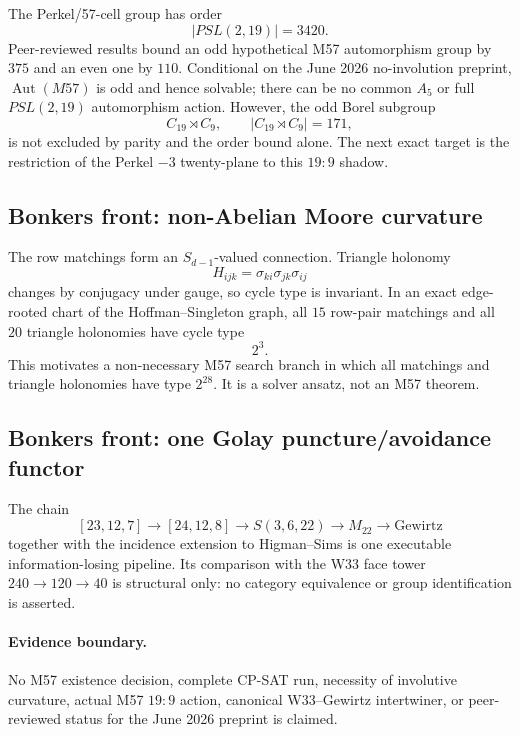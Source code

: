 The Perkel/57-cell group has order
\[
|PSL(2,19)|=3420.
\]
Peer-reviewed results bound an odd hypothetical M57 automorphism group by
\(375\) and an even one by \(110\).  Conditional on the June 2026
no-involution preprint, \(\operatorname{Aut}(M57)\) is odd and hence solvable;
there can be no common \(A_5\) or full \(PSL(2,19)\) automorphism action.
However, the odd Borel subgroup
\[
C_{19}\rtimes C_9,\qquad |C_{19}\rtimes C_9|=171,
\]
is not excluded by parity and the order bound alone.  The next exact target is
the restriction of the Perkel \(-3\) twenty-plane to this \(19{:}9\) shadow.

\subsection{Bonkers front: non-Abelian Moore curvature}

The row matchings form an \(S_{d-1}\)-valued connection.  Triangle holonomy
\[
H_{ijk}=\sigma_{ki}\sigma_{jk}\sigma_{ij}
\]
changes by conjugacy under gauge, so cycle type is invariant.  In an exact
edge-rooted chart of the Hoffman--Singleton graph, all \(15\) row-pair
matchings and all \(20\) triangle holonomies have cycle type
\[
2^3.
\]
This motivates a non-necessary M57 search branch in which all matchings and
triangle holonomies have type \(2^{28}\).  It is a solver ansatz, not an M57
theorem.

\subsection{Bonkers front: one Golay puncture/avoidance functor}

The chain
\[
[23,12,7]\to[24,12,8]\to S(3,6,22)\to M_{22}\to\mathrm{Gewirtz}
\]
together with the incidence extension to Higman--Sims is one executable
information-losing pipeline.  Its comparison with the W33 face tower
\(240\to120\to40\) is structural only: no category equivalence or group
identification is asserted.

\paragraph{Evidence boundary.}
No M57 existence decision, complete CP-SAT run, necessity of involutive
curvature, actual M57 \(19{:}9\) action, canonical W33--Gewirtz intertwiner,
or peer-reviewed status for the June 2026 preprint is claimed.
